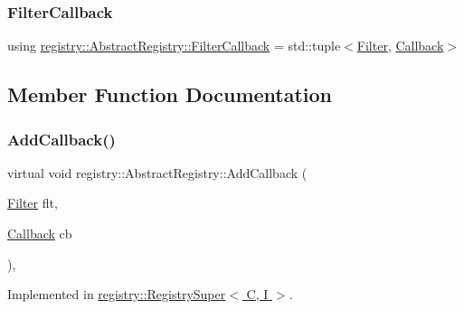\mbox{\label{classregistry_1_1AbstractRegistry_a31f6bef634dcd324efebaf55f99b950f}} 
\subsubsection{\texorpdfstring{Filter\+Callback}{FilterCallback}}
{\footnotesize\ttfamily using \hyperlink{classregistry_1_1AbstractRegistry_a31f6bef634dcd324efebaf55f99b950f}{registry\+::\+Abstract\+Registry\+::\+Filter\+Callback} =  std\+::tuple$<$\hyperlink{classregistry_1_1Filter}{Filter}, \hyperlink{classregistry_1_1AbstractRegistry_a08a798ca9ca1c4c983ebd2386ca3c315}{Callback}$>$}



\subsection{Member Function Documentation}
\mbox{\label{classregistry_1_1AbstractRegistry_a83f61ca483c22185ddf43653ca65a8ef}} 
\subsubsection{\texorpdfstring{Add\+Callback()}{AddCallback()}}
{\footnotesize\ttfamily virtual void registry\+::\+Abstract\+Registry\+::\+Add\+Callback (\begin{DoxyParamCaption}\item[{\hyperlink{classregistry_1_1Filter}{Filter}}]{flt,  }\item[{\hyperlink{classregistry_1_1AbstractRegistry_a08a798ca9ca1c4c983ebd2386ca3c315}{Callback}}]{cb }\end{DoxyParamCaption})\hspace{0.3cm}{\ttfamily [pure virtual]}, {\ttfamily [noexcept]}}



Implemented in \hyperlink{classregistry_1_1RegistrySuper_a80e234502449509e0c9ce75e787ef974}{registry\+::\+Registry\+Super$<$ C, I $>$}.

